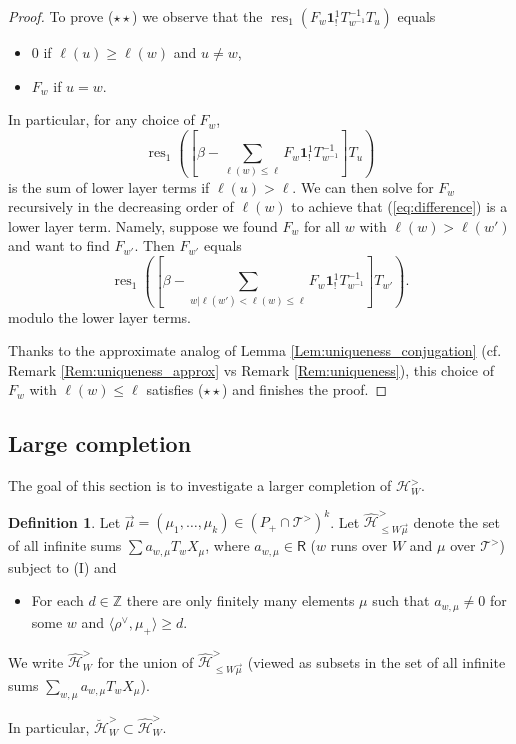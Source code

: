 \documentclass{amsart}
\newcommand{\Hecke}{\mathcal{H}}
\newcommand{\Z}{\mathbb{Z}}
\newcommand{\Ring}{\mathsf{R}}
\newcommand{\bone}{\mathbf{1}}
\theoremstyle{definition}
\newtheorem{defi}[Thm]{Definition}
\numberwithin{equation}{section}
\begin{document}
\begin{proof}
To prove ($\star\star$) we observe that the  $\operatorname{res}_1(F_w \bone_!^1T_{w^{-1}}^{-1}T_u)$ equals
\begin{itemize}
\item
$0$ if $\ell(u)\geqslant \ell(w)$ and $u\neq w$,
\item $F_w$ if $u=w$.
\end{itemize}
In particular, for any choice of $F_w$, 
\begin{equation}\label{eq:difference}
\operatorname{res}_1([\beta-\sum_{\ell(w)\leqslant \ell}F_w \bone_!^1 T_{w^{-1}}^{-1}]T_u)
\end{equation} is the sum of lower layer terms if $\ell(u)>\ell$. We can then solve for $F_w$ recursively in the decreasing order of $\ell(w)$ to achieve that (\ref{eq:difference}) is a lower layer term. Namely, suppose we found $F_w$ for all $w$ with $\ell(w)>\ell(w')$ and want to find $F_{w'}$. Then 
 $F_{w'}$ equals $$\operatorname{res}_1([\beta-\sum_{w|\ell(w')<\ell(w)\leqslant \ell}F_w\bone_!^1T^{-1}_{w^{-1}}]T_{w'}).$$
 modulo the lower layer terms.


Thanks to the approximate analog of Lemma \ref{Lem:uniqueness_conjugation} (cf. Remark \ref{Rem:uniqueness_approx} vs Remark \ref{Rem:uniqueness}), this choice of $F_w$ with $\ell(w)\leqslant \ell$ satisfies ($\star\star$) and finishes the proof.
\end{proof}

\subsection{Large completion}\label{SS_large_completion}
The goal of this section is to investigate a larger completion of $\Hecke_W^>$.

\begin{defi}\label{defi:large_completion}
Let $\vec{\mu}=(\mu_1,\ldots,\mu_k)\in (P_+\cap \mathcal{T}^>)^k$. Let
$\widehat{\Hecke}^{>}_{\leqslant W\vec{\mu}}$ denote the set of all infinite sums $\sum a_{w,\mu}  T_w X_\mu$, where $a_{w,\mu}\in \Ring$  ($w$ runs over $W$ and $\mu$ over $\mathcal{T}^>$) subject to (I) and
\begin{itemize}
\item[(II')] For each $d\in \Z$ there are only finitely many elements $\mu$ such that $a_{w,\mu}\neq 0$ for some $w$ and $\langle\rho^\vee, \mu_+\rangle\geqslant d$.
\end{itemize}
We write $\widehat{\Hecke}^>_W$ for the union of $\widehat{\Hecke}^>_{\leqslant W\vec{\mu}}$ (viewed as subsets in the set of all infinite sums $\sum_{w,\mu}a_{w,\mu}T_w X_\mu$).
\end{defi}
In particular, $\breve{\Hecke}_W^{>}\subset \widehat{\Hecke}^>_W$.
\end{document}
